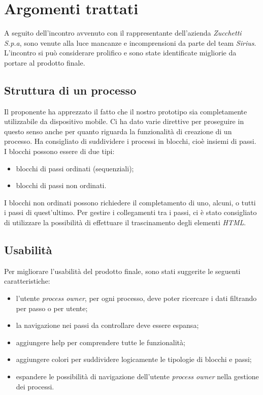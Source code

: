 \section{Argomenti trattati}

A seguito dell'incontro avvenuto con il rappresentante dell'azienda  \textit{Zucchetti S.p.a}, sono venute alla luce mancanze e incomprensioni da parte del team \textit{Sirius}. L'incontro si può considerare prolifico e sono state identificate migliorie da portare al prodotto finale.

\subsection{Struttura di un processo}

Il proponente ha apprezzato il fatto che il nostro prototipo sia completamente utilizzabile da dispositivo mobile. Ci ha dato varie direttive per proseguire in questo senso anche per quanto riguarda la funzionalità di creazione di un processo.
Ha consigliato di suddividere i processi in blocchi, cioè insiemi di passi.
I blocchi possono essere di due tipi:
\begin{itemize}
	\item blocchi di passi ordinati (sequenziali);
	\item blocchi di passi non ordinati.
\end{itemize}
I blocchi non ordinati possono richiedere il completamento di uno, alcuni, o tutti i passi di quest'ultimo.
Per gestire i collegamenti tra i passi, ci è stato consigliato di utilizzare la possibilità di effettuare il trascinamento degli elementi  \textit{HTML}.


\subsection{Usabilità}
Per migliorare l'usabilità del prodotto finale, sono stati suggerite le seguenti caratteristiche:
\begin{itemize}
	\item l'utente \textit{process owner}, per ogni processo, deve poter ricercare i dati filtrando per passo o per utente;
	\item la navigazione nei passi da controllare deve essere espansa;
	\item aggiungere help per comprendere tutte le funzionalità;
	\item aggiungere colori per suddividere logicamente le tipologie di blocchi e passi;
	\item espandere le possibilità di navigazione dell'utente \textit{process owner} nella gestione dei processi.
\end{itemize}

